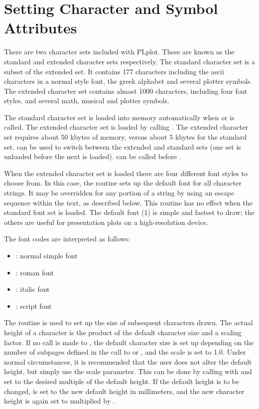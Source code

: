 \section{Setting Character and Symbol Attributes}

There are two character sets included with PLplot.  These are known as
the standard and extended character sets respectively.  The standard
character set is a subset of the extended set.  It contains 177
characters including the ascii characters in a normal style font, the
greek alphabet and several plotter symbols.  The extended character set
contains almost 1000 characters, including four font styles, and several
math, musical and plotter symbols.

The standard character set is loaded into memory automatically when
 or  is called.  The extended character set
is loaded by calling .  The extended character set
requires about 50 kbytes of memory, versus about 5 kbytes for the
standard set.   can be used to switch between the
extended and standard sets (one set is unloaded before the next is
loaded).   can be called before .

When the extended character set is loaded there are four different font
styles to choose from.  In this case, the routine  sets up the
default font for all character strings.  It may be overridden for any
portion of a string by using an escape sequence within the text, as
described below.  This routine has no effect when the standard font set is
loaded.  The default font (1) is simple and fastest to draw; the others are
useful for presentation plots on a high-resolution device.

The font codes are interpreted as follows:
\begin{itemize}
   \item{}: normal simple font
   \item{}: roman font
   \item{}: italic font
   \item{}: script font
\end{itemize}

The routine  is used to set up the size of subsequent
characters drawn.  The actual height of a character is the product of
the default character size and a scaling factor.  If no call is made to
, the default character size is set up depending on the
number of subpages defined in the call to  or
, and the scale is set to 1.0.  Under normal
circumstances, it is recommended that the user does not alter the
default height, but simply use the scale parameter.  This can be done by
calling  with  and  set to the
desired multiple of the default height.  If the default height is to be
changed,  is set to the new default height in millimeters, and
the new character height is again set to  multiplied by
.

